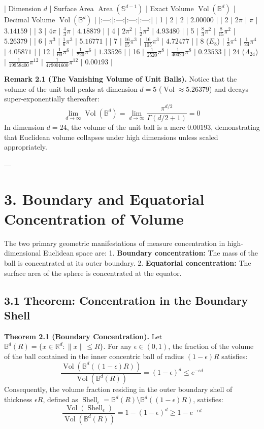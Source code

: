 \documentclass[11pt,twoside,openright]{amsbook}
\begin{document}
| Dimension $d$ | Surface Area $\operatorname{Area}(\mathbb{S}^{d-1})$ | Exact Volume $\operatorname{Vol}(\mathbb{B}^d)$ | Decimal Volume $\operatorname{Vol}(\mathbb{B}^d)$ |
|:---:|:---:|:---:|:---:|
| 1 | $2$ | $2$ | $2.00000$ |
| 2 | $2\pi$ | $\pi$ | $3.14159$ |
| 3 | $4\pi$ | $\frac{4}{3}\pi$ | $4.18879$ |
| 4 | $2\pi^2$ | $\frac{1}{2}\pi^2$ | $4.93480$ |
| 5 | $\frac{8}{3}\pi^2$ | $\frac{8}{15}\pi^2$ | $5.26379$ |
| 6 | $\pi^3$ | $\frac{1}{6}\pi^3$ | $5.16771$ |
| 7 | $\frac{16}{15}\pi^3$ | $\frac{16}{105}\pi^3$ | $4.72477$ |
| 8 ($E_8$) | $\frac{1}{3}\pi^4$ | $\frac{1}{24}\pi^4$ | $4.05871$ |
| 12 | $\frac{1}{60}\pi^6$ | $\frac{1}{720}\pi^6$ | $1.33526$ |
| 16 | $\frac{1}{2520}\pi^8$ | $\frac{1}{40320}\pi^8$ | $0.23533$ |
| 24 ($\Lambda_{24}$) | $\frac{1}{19958400}\pi^{12}$ | $\frac{1}{479001600}\pi^{12}$ | $0.00193$ |

\textbf{Remark 2.1 (The Vanishing Volume of Unit Balls).} Notice that the volume of the unit ball peaks at dimension $d = 5$ ($\operatorname{Vol} \approx 5.26379$) and decays super-exponentially thereafter:
$$\lim_{d \to \infty} \operatorname{Vol}(\mathbb{B}^d) = \lim_{d \to \infty} \frac{\pi^{d/2}}{\Gamma(d/2 + 1)} = 0$$
In dimension $d = 24$, the volume of the unit ball is a mere $0.00193$, demonstrating that Euclidean volume collapses under high dimensions unless scaled appropriately.

---

\section{3. Boundary and Equatorial Concentration of Volume}

The two primary geometric manifestations of measure concentration in high-dimensional Euclidean space are:
1. \textbf{Boundary concentration:} The mass of the ball is concentrated at its outer boundary.
2. \textbf{Equatorial concentration:} The surface area of the sphere is concentrated at the equator.

\subsection{3.1 Theorem: Concentration in the Boundary Shell}

\textbf{Theorem 2.1 (Boundary Concentration).} Let $\mathbb{B}^d(R) = \{x \in \mathbb{R}^d : \|x\| \le R\}$. For any $\epsilon \in (0, 1)$, the fraction of the volume of the ball contained in the inner concentric ball of radius $(1 - \epsilon)R$ satisfies:
$$\frac{\operatorname{Vol}(\mathbb{B}^d((1 - \epsilon)R))}{\operatorname{Vol}(\mathbb{B}^d(R))} = (1 - \epsilon)^d \le e^{-\epsilon d}$$
Consequently, the volume fraction residing in the outer boundary shell of thickness $\epsilon R$, defined as $\operatorname{Shell}_\epsilon = \mathbb{B}^d(R) \setminus \mathbb{B}^d((1 - \epsilon)R)$, satisfies:
$$\frac{\operatorname{Vol}(\operatorname{Shell}_\epsilon)}{\operatorname{Vol}(\mathbb{B}^d(R))} = 1 - (1 - \epsilon)^d \ge 1 - e^{-\epsilon d}$$
\end{document}
